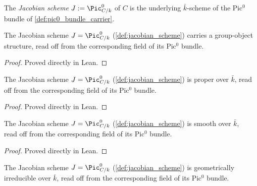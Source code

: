 \begin{definition}
  \label{def:jacobian_scheme}

  The \emph{Jacobian scheme} \(J := \Pic^0_{C/k}\) of \(C\) is the underlying
  \(\bar k\)-scheme of the Pic\(^0\) bundle of
  \cref{def:pic0_bundle_carrier}.
\end{definition}

\begin{lemma}
  \label{lem:jacobian_scheme_grpObj}

  The Jacobian scheme \(J = \Pic^0_{C/k}\) (\cref{def:jacobian_scheme})
  carries a group-object structure, read off from the corresponding field of
  its Pic\(^0\) bundle.
\end{lemma}

\begin{proof} Proved directly in Lean. \end{proof}

\begin{lemma}
  \label{lem:jacobian_scheme_isProper}

  The Jacobian scheme \(J = \Pic^0_{C/k}\) (\cref{def:jacobian_scheme}) is
  proper over \(\bar k\), read off from the corresponding field of its
  Pic\(^0\) bundle.
\end{lemma}

\begin{proof} Proved directly in Lean. \end{proof}

\begin{lemma}
  \label{lem:jacobian_scheme_smooth}

  The Jacobian scheme \(J = \Pic^0_{C/k}\) (\cref{def:jacobian_scheme}) is
  smooth over \(\bar k\), read off from the corresponding field of its
  Pic\(^0\) bundle.
\end{lemma}

\begin{proof} Proved directly in Lean. \end{proof}

\begin{lemma}
  \label{lem:jacobian_scheme_geomIrred}

  The Jacobian scheme \(J = \Pic^0_{C/k}\) (\cref{def:jacobian_scheme}) is
  geometrically irreducible over \(\bar k\), read off from the corresponding
  field of its Pic\(^0\) bundle.
\end{lemma}

